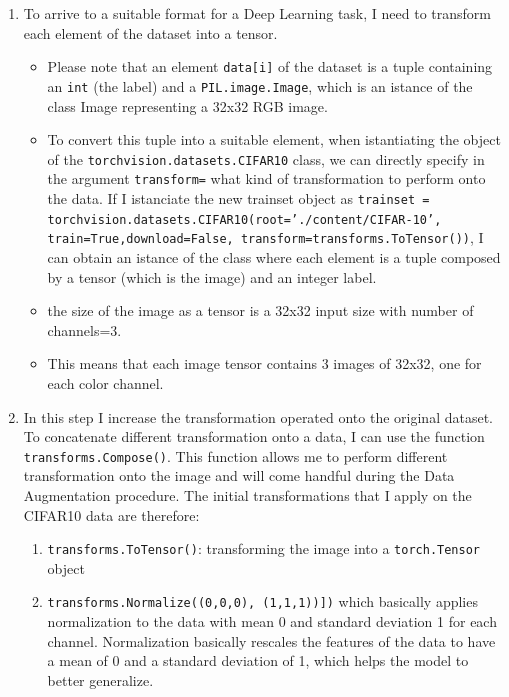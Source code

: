 \documentclass[a4paper]{article}
\begin{document}
\begin{enumerate}
	\item To arrive to a suitable format for a Deep Learning task, I need to transform each element of the dataset into a tensor. 
    \begin{itemize}
	    \item Please note that an element \texttt{data[i]} of the dataset is a tuple containing an \texttt{int} (the label) and a \texttt{PIL.image.Image}, which is an istance of the class Image representing a 32x32 RGB image.
        \item To convert this tuple into a suitable element, when istantiating the object of the \texttt{torchvision.datasets.CIFAR10} class, we can directly specify in the argument \texttt{transform=} what kind of transformation to perform onto the data. If I istanciate the new trainset object as \newline \texttt{trainset = torchvision.datasets.CIFAR10(root='./content/CIFAR-10', train=True,download=False, transform=transforms.ToTensor())}, I can obtain an istance of the class where each element is a tuple composed by a tensor (which is the image) and an integer label.
        \item  the size of the image as a tensor is a 32x32 input size with number of channels=3.
        \item This means that each image tensor contains 3 images of 32x32, one for each color channel. 
	\end{itemize}
	\item In this step I increase the transformation operated onto the original dataset. To concatenate different transformation onto a data, I can use the function \texttt{transforms.Compose()}. This function allows me to perform different transformation onto the image and will come handful during the Data Augmentation procedure. The initial transformations that I apply on the CIFAR10 data are therefore:
    \begin{enumerate}
        \item \texttt{transforms.ToTensor()}: transforming the image into a \texttt{torch.Tensor} object
        \item \texttt{transforms.Normalize((0,0,0), (1,1,1))])} which basically applies normalization to the data with mean 0 and standard deviation 1 for each channel. Normalization basically rescales the features of the data to have a mean of 0 and a standard deviation of 1, which helps the model to better generalize.
    \end{enumerate}
	

\end{enumerate}
\end{document}
